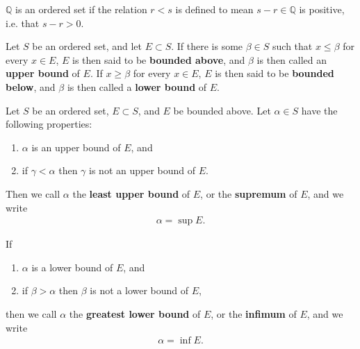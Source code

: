 \documentclass[12pt]{article}
\begin{document}
\begin{exm}
  $\mathbb{Q}$ is an ordered set if the relation $r < s$ is defined to mean $s - r
  \in \mathbb{Q}$ is positive, i.e. that $s - r > 0$.
\end{exm}

\begin{defn}
  Let $S$ be an ordered set, and let $E \subset S$. If there is some $\beta \in S$
  such that $x \leq \beta$ for every $x \in E$, $E$ is then said to be
  \textbf{bounded above}, and $\beta$ is then called an \textbf{upper bound} of $E$.
  If $x \geq \beta$ for every $x \in E$, $E$ is then said to be \textbf{bounded
  below}, and $\beta$ is then called a \textbf{lower bound} of $E$.
\end{defn}

\begin{defn}
  Let $S$ be an ordered set, $E \subset S$, and $E$ be bounded above. Let $\alpha \in
  S$ have the following properties:
  \begin{enumerate}
    \item
      $\alpha$ is an upper bound of $E$, and
    \item
      if $\gamma < \alpha$ then $\gamma$ is not an upper bound of $E$.
  \end{enumerate}
  Then we call $\alpha$ the \textbf{least upper bound} of $E$, or the
  \textbf{supremum} of $E$, and we write
  \begin{align*}
    \alpha = \sup E.
  \end{align*}

  If
  \begin{enumerate}
    \item
      $\alpha$ is a lower bound of $E$, and
    \item
      if $\beta > \alpha$ then $\beta$ is not a lower bound of $E$,
  \end{enumerate}
  then we call $\alpha$ the \textbf{greatest lower bound} of $E$, or the
  \textbf{infimum} of $E$, and we write
  \begin{align*}
    \alpha = \inf E.
  \end{align*}
\end{defn}
\end{document}
